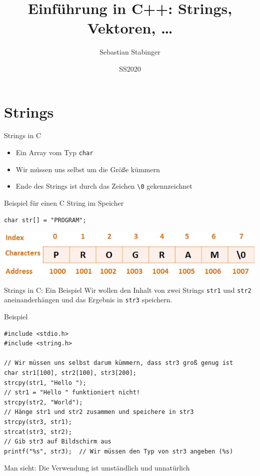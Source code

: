 \documentclass[presentation]{beamer}
\author{Sebastian Stabinger}
\date{SS2020}
\title{Einführung in C++: Strings, Vektoren, \ldots{}}
\begin{document}
\maketitle

\section{Strings}
\label{sec:org17bb6ed}
\begin{frame}[fragile,label={sec:org45a4c14}]{Strings in C}
 \begin{itemize}
\item Ein Array vom Typ {\color{solarizedYellow}\texttt{char}}
\item Wir müssen uns selbst um die Größe kümmern
\item Ende des Strings ist durch das Zeichen {\color{solarizedYellow}\texttt{\textbackslash{}0} }gekennzeichnet
\end{itemize}
\begin{block}{Beispiel für einen C String im Speicher}
\begin{verbatim}
char str[] = "PROGRAM";
\end{verbatim}
\begin{center}\begin{center}
\includegraphics[width=.9\linewidth]{data/cb/fcc991-bddd-49c7-a9fb-fff24aa41a8b/screenshot-20160221-203103.png}
\end{center}\end{center}
\end{block}
\end{frame}
\begin{frame}[fragile,label={sec:org17a9e47}]{Strings in C: Ein Beispiel}
 Wir wollen den Inhalt von zwei Strings {\color{solarizedYellow}\texttt{str1} }und {\color{solarizedYellow}\texttt{str2}}
aneinanderhängen und das Ergebnis in {\color{solarizedYellow}\texttt{str3} }speichern.
\begin{exampleblock}{Beispiel}
\begin{verbatim}
#include <stdio.h>
#include <string.h>

// Wir müssen uns selbst darum kümmern, dass str3 groß genug ist
char str1[100], str2[100], str3[200];
strcpy(str1, "Hello ");
// str1 = "Hello " funktioniert nicht!
strcpy(str2, "World");
// Hänge str1 und str2 zusammen und speichere in str3
strcpy(str3, str1);
strcat(str3, str2);
// Gib str3 auf Bildschirm aus
printf("%s", str3);  // Wir müssen den Typ von str3 angeben (%s)
\end{verbatim}
\end{exampleblock}
Man sieht: Die Verwendung ist \alert{umständlich und unnatürlich}
\end{frame}
\end{document}
